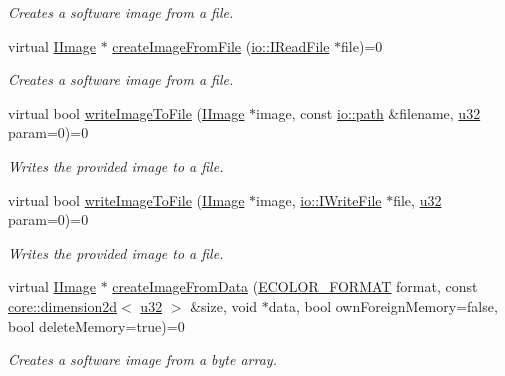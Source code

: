 \begin{DoxyCompactItemize}
\begin{DoxyCompactList}\small\item\em Creates a software image from a file. \end{DoxyCompactList}\item 
virtual \hyperlink{classirr_1_1video_1_1IImage}{I\+Image} $\ast$ \hyperlink{classirr_1_1video_1_1IVideoDriver_a322c41fa08c1da9de4633cf8a1e68607}{create\+Image\+From\+File} (\hyperlink{classirr_1_1io_1_1IReadFile}{io\+::\+I\+Read\+File} $\ast$file)=0
\begin{DoxyCompactList}\small\item\em Creates a software image from a file. \end{DoxyCompactList}\item 
virtual bool \hyperlink{classirr_1_1video_1_1IVideoDriver_a407d6a1483f995060035340e0a92ce9b}{write\+Image\+To\+File} (\hyperlink{classirr_1_1video_1_1IImage}{I\+Image} $\ast$image, const \hyperlink{namespaceirr_1_1io_ab1bdc45edb3f94d8319c02bc0f840ee1}{io\+::path} \&filename, \hyperlink{namespaceirr_a0416a53257075833e7002efd0a18e804}{u32} param=0)=0
\begin{DoxyCompactList}\small\item\em Writes the provided image to a file. \end{DoxyCompactList}\item 
virtual bool \hyperlink{classirr_1_1video_1_1IVideoDriver_ae12c362cfbc92a7c59b434666c8436c0}{write\+Image\+To\+File} (\hyperlink{classirr_1_1video_1_1IImage}{I\+Image} $\ast$image, \hyperlink{classirr_1_1io_1_1IWriteFile}{io\+::\+I\+Write\+File} $\ast$file, \hyperlink{namespaceirr_a0416a53257075833e7002efd0a18e804}{u32} param=0)=0
\begin{DoxyCompactList}\small\item\em Writes the provided image to a file. \end{DoxyCompactList}\item 
virtual \hyperlink{classirr_1_1video_1_1IImage}{I\+Image} $\ast$ \hyperlink{classirr_1_1video_1_1IVideoDriver_a425d60f2fcad42d8a79c33c587f41a06}{create\+Image\+From\+Data} (\hyperlink{namespaceirr_1_1video_a1d5e487888c32b1674a8f75116d829ed}{E\+C\+O\+L\+O\+R\+\_\+\+F\+O\+R\+M\+AT} format, const \hyperlink{classirr_1_1core_1_1dimension2d}{core\+::dimension2d}$<$ \hyperlink{namespaceirr_a0416a53257075833e7002efd0a18e804}{u32} $>$ \&size, void $\ast$data, bool own\+Foreign\+Memory=false, bool delete\+Memory=true)=0
\begin{DoxyCompactList}\small\item\em Creates a software image from a byte array. \end{DoxyCompactList}\item 

\end{DoxyCompactItemize}
